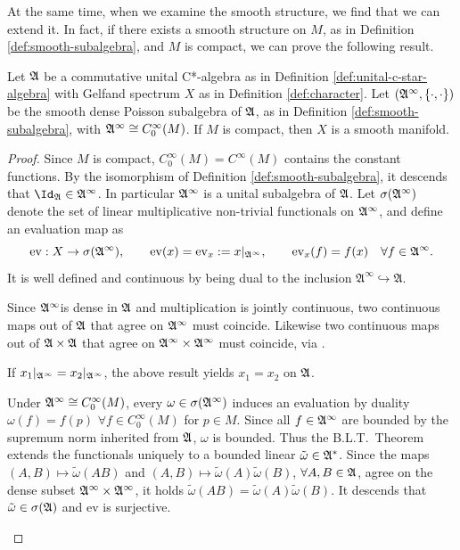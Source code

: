 	At the same time, when we examine the smooth structure, we find that we can extend it. In fact, if there exists a smooth structure on $M$, as in Definition \ref{def:smooth-subalgebra}, and $M$ is compact, we can prove the following result.
	
	\begin{proposition}
		Let \(\mathfrak{A}\) be a commutative unital C*-algebra as in Definition \ref{def:unital-c-star-algebra} with Gelfand spectrum \(X\) as in Definition \ref{def:character}. Let \((\mathfrak{A}^\infty, \{\cdot,\cdot\})\) be the smooth dense Poisson subalgebra of $\mathfrak{A}$, as in Definition \ref{def:smooth-subalgebra}, with \(\mathfrak{A}^\infty \cong C_0^\infty(M)\). If \(M\) is compact, then \(X\) is a smooth manifold.
	\end{proposition}
	
	\begin{proof}
		Since $M$ is compact, $C_0^\infty(M) = C^\infty(M)$ contains the constant functions. By the isomorphism of Definition \ref{def:smooth-subalgebra}, it descends that $\Id_{\A} \in \A^\infty$. In particular $\mathfrak{A}^\infty$ is a unital subalgebra of $\mathfrak{A}$. Let $\sigma(\mathfrak{A}^\infty)$ denote the set of linear multiplicative non-trivial functionals on $\mathfrak{A}^\infty$, and define an evaluation map as
		\[
		\mathrm{ev} : X \to \sigma(\mathfrak{A}^\infty), \qquad
		\mathrm{ev}(x) = \mathrm{ev}_x := x|_{\mathfrak{A}^\infty}, \qquad
		\mathrm{ev}_x(f) = f(x) \quad \forall f \in \mathfrak{A}^\infty.
		\]
		It is well defined and continuous by \cite[Construction p.~92]{landsmanFoundationsQuantumTheory2017} being dual to the inclusion $\mathfrak{A}^\infty \hookrightarrow \mathfrak{A}$.
		
		\noindent Since $\mathfrak{A}^\infty$is dense in $\mathfrak{A}$ and multiplication is jointly continuous, two continuous maps out of $\mathfrak{A}$ that agree on $\mathfrak{A}^\infty$ must coincide. Likewise two continuous maps out of $\mathfrak{A} \times \mathfrak{A}$ that agree on $\mathfrak{A}^\infty \times \mathfrak{A}^\infty$ must coincide, via \cite[Exercise 13, \S 18]{munkresTopology2000}.
		
		\begin{description}[wide=0pt, leftmargin=*, font=\normalfont\itshape]
			\item[Injectivity.] If $x_1|_{\mathfrak{A}^\infty} = x_2|_{\mathfrak{A}^\infty}$, the above result yields $x_1 = x_2$ on $\mathfrak{A}$.
			\item[Surjectivity.] Under $\mathfrak{A}^\infty \cong C_0^\infty(M)$, every $\omega \in \sigma(\mathfrak{A}^\infty)$ induces an evaluation by duality $\omega(f) = f(p)$ $\forall f \in C_0^\infty(M)$ for $p \in M$. Since all $f \in \mathfrak{A}^\infty$ are bounded by the supremum norm inherited from $\mathfrak{A}$, $\omega$ is bounded. Thus the B.L.T.\ Theorem \cite[Theorem I.7]{reedMethodsModernMathematical2003} extends the functionals uniquely to a bounded linear $\tilde\omega \in \mathfrak{A}^*$. Since the maps $(A,B) \mapsto \tilde\omega(AB)$ and $(A,B) \mapsto \tilde\omega(A)\tilde\omega(B)$, $\forall A,B \in \mathfrak{A}$, agree on the dense subset $\mathfrak{A}^\infty \times \mathfrak{A}^\infty$, it holds $\tilde\omega(AB) = \tilde\omega(A)\tilde\omega(B)$. It descends that $\tilde\omega \in \sigma(\mathfrak{A})$ and $\mathrm{ev}$ is surjective.
		\end{description}
		

\end{proof}
